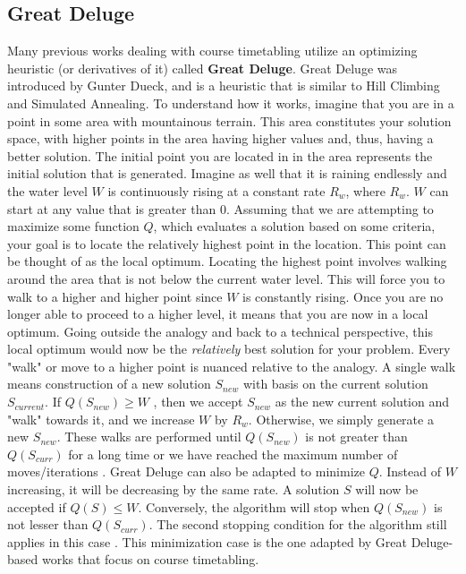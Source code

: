 \subsection{Great Deluge}
Many previous works dealing with course timetabling utilize an optimizing heuristic (or derivatives of it) called \textbf{Great Deluge}. Great Deluge was introduced by Gunter Dueck, and is a heuristic that is similar to Hill Climbing and Simulated Annealing. To understand how it works, imagine that you are in a point in some area with mountainous terrain. This area constitutes your solution space, with higher points in the area having higher values and, thus, having a better solution. The initial point you are located in in the area represents the initial solution that is generated. Imagine as well that it is raining endlessly and the water level $W$ is continuously rising at a constant rate $R_{w}$, where $R_{w}$. $W$ can start at any value that is greater than $0$. Assuming that we are attempting to maximize some function $Q$, which evaluates a solution based on some criteria, your goal is to locate the relatively highest point in the location. This point can be thought of as the local optimum. Locating the highest point involves walking around the area that is not below the current water level. This will force you to walk to a higher and higher point since $W$ is constantly rising. Once you are no longer able to proceed to a higher level, it means that you are now in a local optimum. Going outside the analogy and back to a technical perspective, this local optimum would now be the \textit{relatively} best solution for your problem. Every "walk" or move to a higher point is nuanced relative to the analogy. A single walk means construction of a new solution $S_{new}$ with basis on the current solution $S_{current}$. If $Q(S_{new}) \geq W$ \cite{gd-burke}, then we accept $S_{new}$ as the new current solution and "walk" towards it, and we increase $W$ by $R_{w}$. Otherwise, we simply generate a new $S_{new}$. These walks are performed until $Q(S_{new})$ is not greater than $Q(S_{curr})$ for a long time or we have reached the maximum number of moves/iterations \cite{intro-gd-dueck}. Great Deluge can also be adapted to minimize $Q$. Instead of $W$ increasing, it will be decreasing by the same rate. A solution $S$ will now be accepted if $Q(S) \leq W$. Conversely, the algorithm will stop when $Q(S_{new})$ is not lesser than $Q(S_{curr})$. The second stopping condition for the algorithm still applies in this case \cite{gd-burke}\cite{nlgd-landa-silva}\cite{nlgdrl-obit}. This minimization case is the one adapted by Great Deluge-based works that focus on course timetabling.

